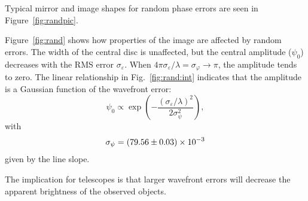 \documentclass{article}
\newcommand{\eps}{\varepsilon}
\newcommand{\ph}{\varphi}
\begin{document}
Typical mirror and image shapes for random phase errors are seen in Figure~\ref{fig:randpic}.

Figure~\ref{fig:rand} shows how properties of the image are affected by random errors. The width of the central disc is unaffected, but the central amplitude ($\psi_0$) decreases with the RMS error $\sigma_\eps$. When $4\pi\sigma_\eps / \lambda = \sigma_\ph \rightarrow \pi$, the amplitude tends to zero. The linear relationship in Fig.~\ref{fig:rand:int} indicates that the amplitude is a Gaussian function of the wavefront error:
\begin{equation}\label{eqn:amp-v-rms}
    \psi_0 \propto \exp \left( - \frac{(\sigma_\eps / \lambda)^2}{2 \sigma_\psi^2} \right),
\end{equation}
with
\begin{equation}
    \sigma_\psi = \num{79.56 \pm 0.03 e-3}
\end{equation}
given by the line slope.

The implication for telescopes is that larger wavefront errors will decrease the apparent brightness of the observed objects.
\end{document}
